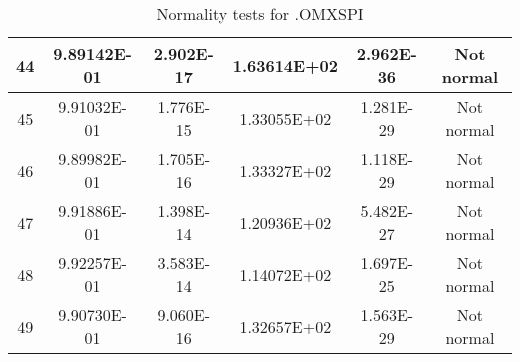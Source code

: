 \begin{table}[h]
\begin{tabular}{|c|c|c|c|c|c|}
		44 & 9.89142E-01 & 2.902E-17 & 1.63614E+02 & 2.962E-36 & Not normal\\\hline
		45 & 9.91032E-01 & 1.776E-15 & 1.33055E+02 & 1.281E-29 & Not normal\\\hline
		46 & 9.89982E-01 & 1.705E-16 & 1.33327E+02 & 1.118E-29 & Not normal\\\hline
		47 & 9.91886E-01 & 1.398E-14 & 1.20936E+02 & 5.482E-27 & Not normal\\\hline
		48 & 9.92257E-01 & 3.583E-14 & 1.14072E+02 & 1.697E-25 & Not normal\\\hline
		49 & 9.90730E-01 & 9.060E-16 & 1.32657E+02 & 1.563E-29 & Not normal\\\hline
	\end{tabular}
	\caption{Normality tests for .OMXSPI}
\end{table}
